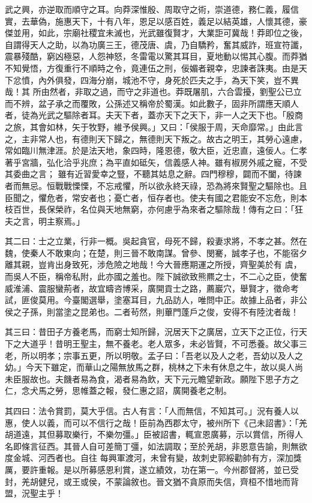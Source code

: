 \begin{pinyinscope}
 武之興，亦逆取而順守之耳。向莽深惟殷、周取守之術，崇道德，務仁義，履信實，去華偽，施惠天下，十有八年，恩足以感百姓，義足以結英雄，人懷其德，豪傑並用，如此，宗廟社稷宜未滅也，光武雖復賢才，大業詎可冀哉！莽即位之後，自謂得天人之助，以為功廣三王，德茂唐、虞，乃自驕矜，奮其威詐，班宣符讖，震暴殘酷，窮凶極惡，人怨神怒，冬雷電以驚其耳目，夏地動以惕其心腹。而莽猶不知覺悟，方復重行不順時之令，竟連伍之刑，佞媚者親幸，忠諫者誅夷。由是天下忿憤，內外俱發，四海分崩，城池不守，身死於匹夫之手，為天下笑，豈不異哉！其
 所由然者，非取之過，而守之非道也。莽既屠肌，六合雲擾，劉聖公已立而不辨，盆子承之而覆敗，公孫述又稱帝於蜀漢。如此數子，固非所謂應天順人者，徒為光武之驅除者耳。夫天下者，蓋亦天下之天下，非一人之天下也。「殷商之旅，其會如林，矢于牧野，維予侯興。」又曰：「侯服于周，天命靡常。」由此言之，主非常人也，有德則天下歸之，無德則天下叛之。故古之明王，其勞心遠慮，常如臨川無津涯。於是法天地，象四時，隆恩德，敬大臣，近忠直，遠佞人。仁孝著乎宮牆，弘化洽乎兆庶；為平直如砥矢，信義感人神。雖有椒房外戚之寵，不受其委曲之言；
 雖有近習愛幸之豎，不聽其姑息之辭。四門穆穆，闢而不闔，待諫者而無忌。恒戰戰慄慄，不忘戒懼，所以欲永終天祿，恐為將來賢聖之驅除也。且臣聞之，懼危者，常安者也；憂亡者，恒存者也。使夫有國之君能安不忘危，則本枝百世，長保榮祚，名位與天地無窮，亦何慮乎為來者之驅除哉！傳有之曰：「狂夫之言，明主察焉。」



 其二曰：士之立業，行非一概。吳起貪官，母死不歸，殺妻求將，不孝之甚。然在魏，使秦人不敢東向；在楚，則三晉不敢南謀。曾參、閔騫，誠孝子也，不能宿夕離其親，豈肯出身致死，涉危險之地哉！今大晉應期運之所授，齊聖美於有
 虞，而吳人不臣，稱帝私附，此亦國之羞也。陛下誠欲致熊羆之士，不二心之臣，使奮威淮浦、震服蠻荊者，故宜疇咨博采，廣開貢士之路，薦巖穴，舉賢才，徵命考試，匪俊莫用。今臺閣選舉，塗塞耳目，九品訪人，唯問中正。故據上品者，非公侯之子孫，則當塗之昆弟也。二者茍然，則蓽門蓬戶之俊，安得不有陸沈者哉！



 其三曰：昔田子方養老馬，而窮士知所歸，況居天下之廣居，立天下之正位，行天下之大道乎！昔明王聖主，無不養老。老人眾多，未必皆賢，不可悉養。故父事三老，所以明孝；宗事五更，所以明敬。孟子曰：「吾老以及人之老，吾幼以及人之
 幼。」今天下雖定，而華山之陽無放馬之群，桃林之下未有休息之牛，故以吳人尚未臣服故也。夫饑者易為食，渴者易為飲，天下元元瞻望新政。願陛下思子方之仁，念犬馬之勞，思帷蓋之報，發仁惠之詔，廣開養老之制。



 其四曰：法令賞罰，莫大乎信。古人有言：「人而無信，不知其可。」況有養人以惠，使人以義，而可以不信行之哉！臣前為西郡太守，被州所下《己未詔書》：「羌胡道遠，其但募取樂行，不樂勿彊。」臣被詔書，輒宣恩廣募，示以賞信，所得人名即條言征西。其晉人自可差簡丁彊，如法調取；至於羌胡，非恩意告諭，則無欲度金城、河西者也。自往
 每興軍渡河，未曾有變，故刺史郭綏勸帥有方，深加獎厲，要許重報。是以所募感恩利賞，遂立績效，功在第一。今州郡督將，並已受封，羌胡健兒，或王或侯，不蒙論敘也。晉文猶不貪原而失信，齊桓不惜地而背盟，況聖主乎！




\end{pinyinscope}
